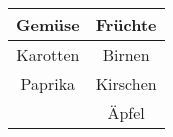 \documentclass[varwidth]{standalone}
\begin{document}
\begin{tabular}{|c|c|}
\hline Gemüse & Früchte \\ 
\hline Karotten & Birnen \\ 
\hline Paprika & Kirschen \\ 
\hline  & Äpfel \\ 
\hline 
\end{tabular} 
\end{document}
